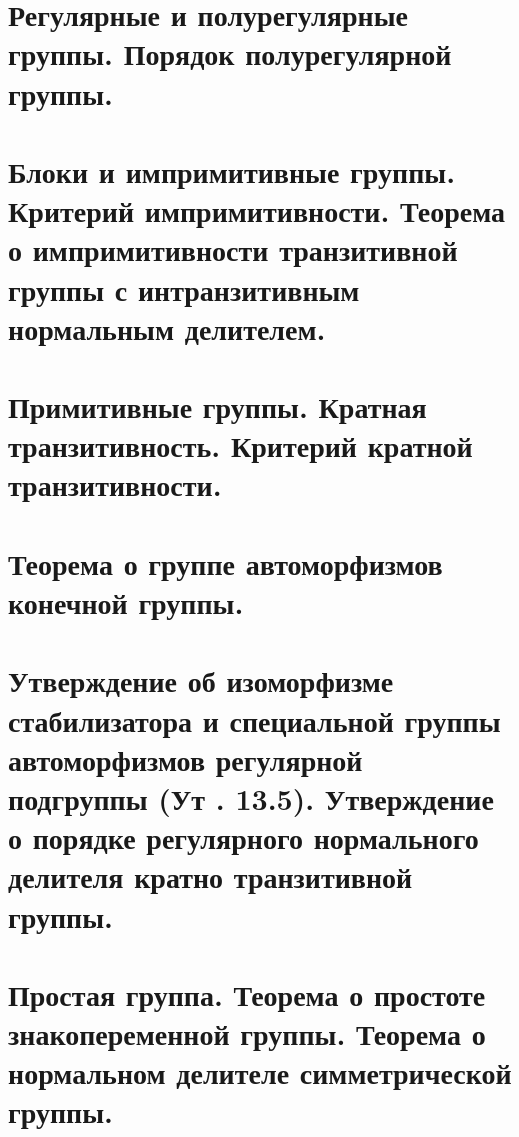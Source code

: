 \documentclass[a4paper,11pt,openany]{book}
\begin{document}
\section{Регулярные и полурегулярные группы. Порядок полурегулярной группы.}
\section{Блоки и импримитивные группы. Критерий импримитивности. Теорема о импримитивности транзитивной группы с интранзитивным нормальным делителем.}
\section{Примитивные группы. Кратная транзитивность. Критерий кратной транзитивности.}
\section{Теорема о группе автоморфизмов конечной группы.}
\section{Утверждение об изоморфизме стабилизатора и специальной группы автоморфизмов регулярной подгруппы (Ут . 13.5). Утверждение о порядке регулярного нормального делителя кратно транзитивной группы.}
\section{Простая группа. Теорема о простоте знакопеременной группы. Теорема о нормальном делителе симметрической группы.}
\end{document}
